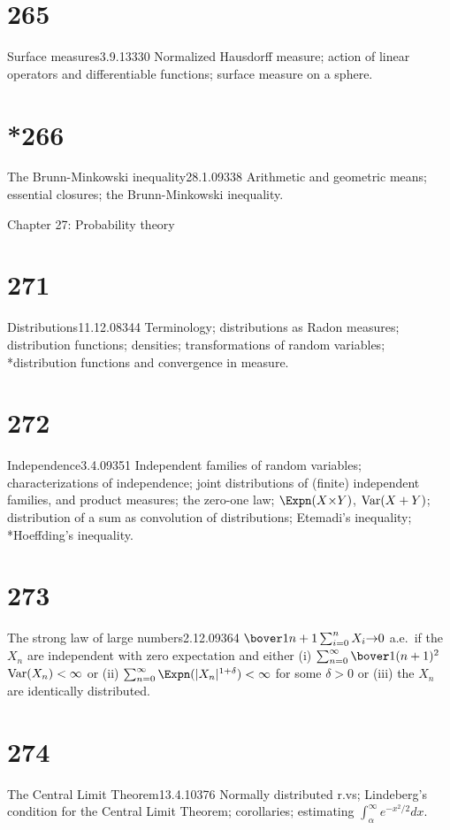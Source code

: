 \section{265}{Surface measures}{3.9.13}{330}{}
{Normalized Hausdorff measure;  action of linear operators and
differentiable functions;  surface measure on a sphere.}

\section{*266}{The Brunn-Minkowski inequality}{28.1.09}{338}{}
{Arithmetic and geometric means;  essential closures;  the
Brunn-Minkowski inequality.}


 Chapter 27:  Probability theory


\section{271}{Distributions}{11.12.08}{344}{}
{Terminology;  distributions as Radon measures;  distribution
functions;  densities;  transformations of random variables;  *distribution
functions and convergence in measure.}

\section{272}{Independence}{3.4.09}{351}{}
{Independent families of random variables;  characterizations of
independence;  joint distributions of (finite) independent families, and
product measures;   the zero-one law;  $\Expn(X{\times}Y)$, $\mathop{\text{Var}}(X+Y)$;
distribution of a sum as convolution of distributions;  Etemadi's
inequality;  *Hoeffding's inequality.}

\section{273}{The strong law of large numbers}{2.12.09}{364}{}
{$\bover1{n+1}\sum_{i=0}^nX_i{\to}0$ a.e.\ if the $X_n$ are
independent with zero expectation and either (i)
$\sum_{n=0}^{\infty}\bover1{(n+1)^2}$
\discretionary{}{}{}$\mathop{\text{Var}}(X_n)<\infty$ or (ii)
$\sum_{n=0}^{\infty}\Expn(|X_n|^{1+\delta})<\infty$ for some $\delta>0$
or (iii) the $X_n$ are identically distributed.}

\section{274}{The Central Limit Theorem}{13.4.10}{376}{}
{Normally distributed r.vs;  Lindeberg's
condition for the Central Limit Theorem;
corollaries;  estimating $\int_{\alpha}^{\infty}e^{-x^2/2}dx$.}


